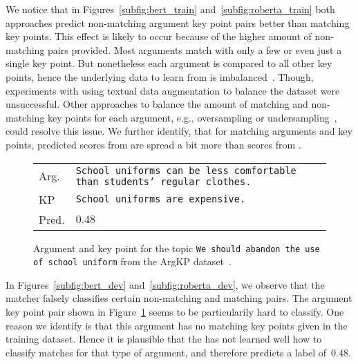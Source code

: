 We notice that in Figures~\ref{subfig:bert_train} and~\ref{subfig:roberta_train} both approaches predict non-matching argument key point pairs better than matching key points.
This effect is likely to occur because of the higher amount of non-matching pairs provided.
Most arguments match with only a few or even just a single key point.
But nonetheless each argument is compared to all other key points, hence the underlying data to learn from is imbalanced~\cite{BarandelaVSF2004}.
Though, experiments with using textual data augmentation to balance the dataset were unsuccessful.
Other approaches to balance the amount of matching and non-matching key points for each argument, e.g., oversampling or undersampling~\cite{Dietterich1995}, could resolve this issue.
We further identify, that for matching arguments and key points, predicted scores from \BertBase are spread a bit more than scores from \RobertaBase.

\begin{figure}
    \begin{tabularx}{\linewidth}{@{}lX@{}}
        Arg. & \texttt{School uniforms can be less comfortable than students' regular clothes.} \\
        KP & \texttt{School uniforms are expensive.} \\
        Pred. & \(0.48\) \\
    \end{tabularx}
    \caption{Argument and key point for the topic \texttt{We should abandon the use of school uniform} from the ArgKP dataset~\cite{Bar-HaimEFKLS2020}.}
    \label{example-4-162-6}
\end{figure}
In Figures~\ref{subfig:bert_dev} and~\ref{subfig:roberta_dev}, we observe that the \BertBase matcher falsely classifies certain non-matching and matching pairs. The argument key point pair shown in Figure~\ref{example-4-162-6} seems to be particularily hard to classify.
One reason we identify is that this argument has no matching key points given in the training dataset.
Hence it is plausible that the \BertBase has not learned well how to classify matches for that type of argument, and therefore predicts a label of~\(0.48\).

